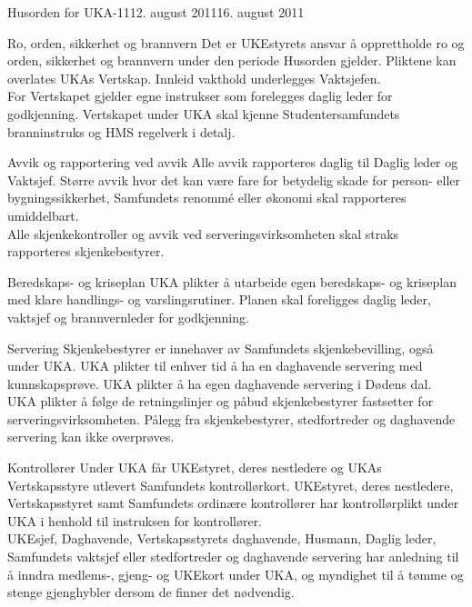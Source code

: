 \documentclass[../fsbok.tex]{subfiles}
\begin{document}
\begin{instruks}{Husorden for UKA-11}{12. august 2011}{16. august 2011}
\begin{instruksledd}{Ro, orden, sikkerhet og brannvern}
Det er UKEstyrets ansvar å opprettholde ro og orden, sikkerhet og brannvern
under den periode Husorden gjelder. Pliktene kan overlates UKAs Vertskap.
Innleid vakthold underlegges Vaktsjefen.\\

For Vertskapet gjelder egne instrukser som forelegges daglig leder for
godkjenning. Vertskapet under UKA skal kjenne Studentersamfundets
branninstruks og HMS regelverk i detalj.
\end{instruksledd}

\begin{instruksledd}{Avvik og rapportering ved avvik}
Alle avvik rapporteres daglig til Daglig leder og Vaktsjef. Større avvik hvor det
kan være fare for betydelig skade for person- eller bygningssikkerhet,
Samfundets renommé eller økonomi skal rapporteres umiddelbart.\\

Alle skjenkekontroller og avvik ved serveringsvirksomheten skal straks
rapporteres skjenkebestyrer.
\end{instruksledd}

\begin{instruksledd}{Beredskaps- og kriseplan}
UKA plikter å utarbeide egen beredskaps- og kriseplan med klare handlings- og
varslingsrutiner. Planen skal foreligges daglig leder, vaktsjef og brannvernleder
for godkjenning.
\end{instruksledd}

\begin{instruksledd}{Servering}
Skjenkebestyrer er innehaver av Samfundets skjenkebevilling, også under UKA.
UKA plikter til enhver tid å ha en daghavende servering med kunnskapsprøve.
UKA plikter å ha egen daghavende servering i Dødens dal.\\

UKA plikter å følge de retningslinjer og påbud skjenkebestyrer fastsetter for
serveringsvirksomheten. Pålegg fra skjenkebestyrer, stedfortreder og
daghavende servering kan ikke overprøves.
\end{instruksledd}

\begin{instruksledd}{Kontrollører}
Under UKA får UKEstyret, deres nestledere og UKAs Vertskapsstyre utlevert
Samfundets kontrollørkort. UKEstyret, deres nestledere, Vertskapsstyret samt
Samfundets ordinære kontrollører har kontrollørplikt under UKA i henhold til
instruksen for kontrollører.\\

UKEsjef, Daghavende, Vertskapsstyrets daghavende, Husmann, Daglig leder,
Samfundets vaktsjef eller stedfortreder og daghavende servering har anledning
til å inndra medlems-, gjeng- og UKEkort under UKA, og myndighet til å tømme
og stenge gjenghybler dersom de finner det nødvendig.\\


\end{instruksledd}
\end{instruks}
\end{document}
